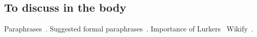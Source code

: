 \documentclass{chi2009}
\begin{document}
% 
% 

% 

% 

\subsection{To discuss in the body}

Paraphrases~\cite{Chklovski2005}. Suggested formal paraphrases~\cite{Blythe2004}.
Importance of Lurkers~\cite{Takahashi2003}
Wikify~\cite{Mihalcea2007}.

%
\end{document}

